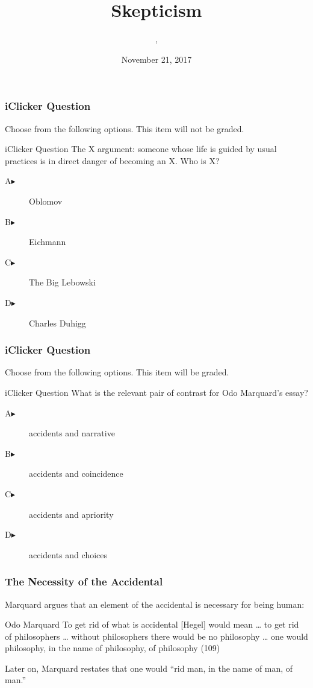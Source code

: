 \documentclass[xcolor=dvipsnames]{beamer}
\title{Skepticism}
\subtitle{{\CourseNumber}, {\CourseInst}}
\author{\CourseName}
\date{November 21, 2017}
\begin{document}
\begin{frame}
  \titlepage
\end{frame}

\begin{frame}
  \frametitle{iClicker Question}
Choose from the following options. This item will not be graded.
\begin{block}{iClicker Question}
The X argument: someone whose life is guided by usual practices is in
direct danger of becoming an X. Who is X?
\end{block}
\begin{description}
\item[A\hspace{.2in}$\blacktriangleright$] Oblomov
\item[B\hspace{.2in}$\blacktriangleright$] Eichmann
\item[C\hspace{.2in}$\blacktriangleright$] The Big Lebowski
\item[D\hspace{.2in}$\blacktriangleright$] Charles Duhigg
\end{description}
\end{frame}

\begin{frame}
  \frametitle{iClicker Question}
Choose from the following options. This item will be graded.
\begin{block}{iClicker Question}
What is the relevant pair of contrast for Odo Marquard's essay?
\end{block}
\begin{description}
\item[A\hspace{.2in}$\blacktriangleright$] accidents and narrative
\item[B\hspace{.2in}$\blacktriangleright$] accidents and coincidence
\item[C\hspace{.2in}$\blacktriangleright$] accidents and apriority
\item[D\hspace{.2in}$\blacktriangleright$] accidents and choices
\end{description}
\end{frame}

\begin{frame}
  \frametitle{The Necessity of the Accidental}
  Marquard argues that an element of the accidental is necessary for
  being human: 
  \begin{block}{Odo Marquard}
    To get rid of what is accidental [Hegel] would mean {\ldots} to
    get rid of philosophers {\ldots} without philosophers there would
    be no philosophy {\ldots} one would philosophy, in the name of
    philosophy, of philosophy (109)
  \end{block}
Later on, Marquard restates that one would ``rid man, in the name of
man, of man.''
\end{frame}
\end{document}
